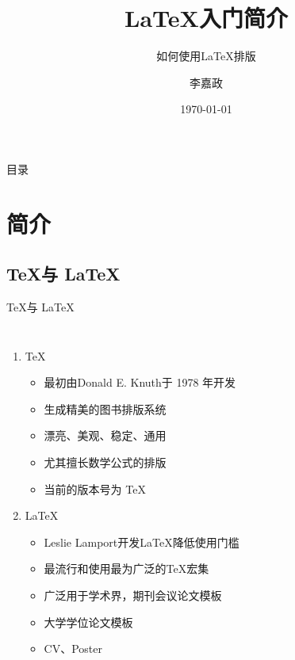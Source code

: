 \documentclass[UTF8,11pt]{ctexbeamer}
\title[如何使用\LaTeX 排版]{\LaTeX 入门简介}
\subtitle{如何使用\LaTeX 排版}
\author{李嘉政}
\date{\today}
\begin{document}
\begin{frame}
    \titlepage
\end{frame}

\begin{frame}{目录}
	\tableofcontents
\end{frame}


\section{简介}
\subsection{\TeX 与 \LaTeX}
\begin{frame}{\TeX 与 \LaTeX}
	\begin{columns}
		\column{8cm}
		\begin{enumerate}
		\item \TeX 
		\begin{itemize}
			\item 最初由Donald E. Knuth于 1978 年开发
			\item 生成精美的图书排版系统
			\item 漂亮、美观、稳定、通用
			\item 尤其擅长数学公式的排版
			\item 当前的版本号为 \TeX {}
		\end{itemize}
		\item \LaTeX 
		\begin{itemize}
			\item Leslie Lamport开发\LaTeX 降低使用门槛
			\item 最流行和使用最为广泛的\TeX 宏集
			\item 广泛用于学术界，期刊会议论文模板
			\item 大学学位论文模板
			\item CV、Poster
		\end{itemize}
		\end{enumerate}
	\column{6cm}

\end{columns}
\end{frame}
\end{document}
